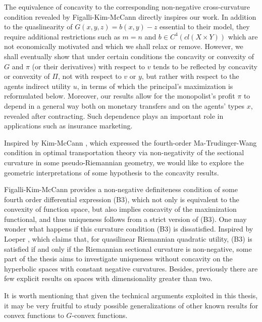 	The equivalence of concavity to the corresponding non-negative cross-curvature condition revealed by Figalli-Kim-McCann \cite{FigalliKimMcCann11} directly inspires our work. In addition to the quaslinearity of
	$G(x,y,z) = b(x,y) - z$ essential to their model,  they require additional restrictions such as $m=n$ and $b \in C^4(cl(X\times Y))$ which are not economically motivated
	and which we shall relax or remove. However,  we shall eventually show that under certain conditions the concavity or convexity of $G$ and $\pi$ (or their derivatives)
	with respect to $v$ tends to be reflected by concavity or convexity of $\Pi$, not with respect to 
	$v$ or $y$,  but rather with respect to the agents indirect utility $u$, in terms of 
	which the principal's maximization is reformulated below. Moreover, our results allow for the monopolist's profit $\pi$ to depend in a general
	way both on monetary transfers and on the agents' types $x$,  revealed after contracting.  Such dependence plays an important role in applications such as insurance marketing.\medskip
	
	Inspired by Kim-McCann \cite{KimMcCann10}, which expressed the fourth-order Ma-Trudinger-Wang condition in optimal transportation theory via non-negativity of the sectional curvature in some pseudo-Riemannian geometry,
	we would like to explore the geometric interpretations of some hypothesis to the concavity results.\medskip


Figalli-Kim-McCann \cite{FigalliKimMcCann11} provides a non-negative definiteness condition of some fourth order differential expression (B3), which not only is equivalent to the convexity of function space,  but also implies concavity of the maximization functional, and thus uniqueness follows from a strict version of (B3). One may wonder what happens if this curvature condition (B3) is dissatisfied. Inspired by Loeper \cite{Loeper09}, which claims that, for quasilinear Riemannian quadratic utility, (B3) is satisfied if and only if the Riemannian sectional curvature is non-negative, some part of the thesis aims to investigate uniqueness  
without concavity on the hyperbolic spaces with constant negative curvatures. Besides, previously there are few explicit results on spaces with dimensionality greater than two.\medskip

It is worth mentioning that given the technical arguments exploited in this thesis, it may be very fruitful to study possible generalizations of other known results for convex functions to $G$-convex functions.
\medskip


